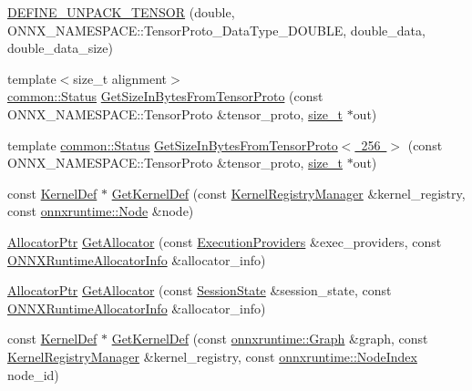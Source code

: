 \begin{DoxyCompactItemize}
\item 
\mbox{\hyperlink{namespaceonnxruntime_1_1utils_ad84e1a43162347e3dc2540869adfc10b}{D\+E\+F\+I\+N\+E\+\_\+\+U\+N\+P\+A\+C\+K\+\_\+\+T\+E\+N\+S\+OR}} (double, O\+N\+N\+X\+\_\+\+N\+A\+M\+E\+S\+P\+A\+C\+E\+::\+Tensor\+Proto\+\_\+\+Data\+Type\+\_\+\+D\+O\+U\+B\+LE, double\+\_\+data, double\+\_\+data\+\_\+size)
\item 
{\footnotesize template$<$size\+\_\+t alignment$>$ }\\\mbox{\hyperlink{classonnxruntime_1_1common_1_1Status}{common\+::\+Status}} \mbox{\hyperlink{namespaceonnxruntime_1_1utils_a2d84b5cf8a44b5c9ac8acdc0fd605544}{Get\+Size\+In\+Bytes\+From\+Tensor\+Proto}} (const O\+N\+N\+X\+\_\+\+N\+A\+M\+E\+S\+P\+A\+C\+E\+::\+Tensor\+Proto \&tensor\+\_\+proto, \mbox{\hyperlink{mlasi_8h_a503efbc1c6e50825320ad909366b78ab}{size\+\_\+t}} $\ast$out)
\item 
template \mbox{\hyperlink{classonnxruntime_1_1common_1_1Status}{common\+::\+Status}} \mbox{\hyperlink{namespaceonnxruntime_1_1utils_a1fd4746352c986ccbda401da7459ba60}{Get\+Size\+In\+Bytes\+From\+Tensor\+Proto$<$ 256 $>$}} (const O\+N\+N\+X\+\_\+\+N\+A\+M\+E\+S\+P\+A\+C\+E\+::\+Tensor\+Proto \&tensor\+\_\+proto, \mbox{\hyperlink{mlasi_8h_a503efbc1c6e50825320ad909366b78ab}{size\+\_\+t}} $\ast$out)
\item 
const \mbox{\hyperlink{classonnxruntime_1_1KernelDef}{Kernel\+Def}} $\ast$ \mbox{\hyperlink{namespaceonnxruntime_1_1utils_a7cc8827cc590f48e3cc3ef8eaa6c4f56}{Get\+Kernel\+Def}} (const \mbox{\hyperlink{classonnxruntime_1_1KernelRegistryManager}{Kernel\+Registry\+Manager}} \&kernel\+\_\+registry, const \mbox{\hyperlink{classonnxruntime_1_1Node}{onnxruntime\+::\+Node}} \&node)
\item 
\mbox{\hyperlink{namespaceonnxruntime_a6cdac724c5dcefded3a63f08dae58fda}{Allocator\+Ptr}} \mbox{\hyperlink{namespaceonnxruntime_1_1utils_a06318e643d42f85829d91db93306ea68}{Get\+Allocator}} (const \mbox{\hyperlink{classonnxruntime_1_1ExecutionProviders}{Execution\+Providers}} \&exec\+\_\+providers, const \mbox{\hyperlink{structONNXRuntimeAllocatorInfo}{O\+N\+N\+X\+Runtime\+Allocator\+Info}} \&allocator\+\_\+info)
\item 
\mbox{\hyperlink{namespaceonnxruntime_a6cdac724c5dcefded3a63f08dae58fda}{Allocator\+Ptr}} \mbox{\hyperlink{namespaceonnxruntime_1_1utils_a1929d3a08af5b86f2040d95ea0f7a7ce}{Get\+Allocator}} (const \mbox{\hyperlink{classonnxruntime_1_1SessionState}{Session\+State}} \&session\+\_\+state, const \mbox{\hyperlink{structONNXRuntimeAllocatorInfo}{O\+N\+N\+X\+Runtime\+Allocator\+Info}} \&allocator\+\_\+info)
\item 
const \mbox{\hyperlink{classonnxruntime_1_1KernelDef}{Kernel\+Def}} $\ast$ \mbox{\hyperlink{namespaceonnxruntime_1_1utils_af84acbefafc1b22b24e6951e7050fe51}{Get\+Kernel\+Def}} (const \mbox{\hyperlink{classonnxruntime_1_1Graph}{onnxruntime\+::\+Graph}} \&graph, const \mbox{\hyperlink{classonnxruntime_1_1KernelRegistryManager}{Kernel\+Registry\+Manager}} \&kernel\+\_\+registry, const \mbox{\hyperlink{namespaceonnxruntime_af8773b5c12b5d8fd9292eb2e268df760}{onnxruntime\+::\+Node\+Index}} node\+\_\+id)
\end{DoxyCompactItemize}


